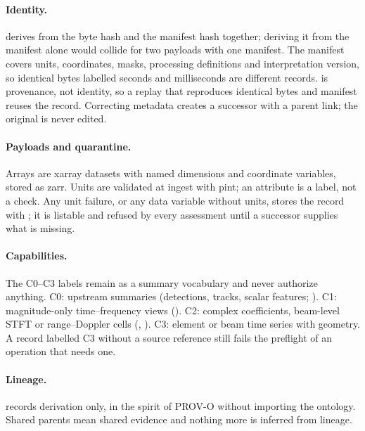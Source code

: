 \documentclass[11pt,a4paper]{article}
\begin{document}
\paragraph{Identity.}  derives from the byte hash and the manifest hash together; deriving it from the manifest alone would collide for two payloads with one manifest. The manifest covers units, coordinates, masks, processing definitions and interpretation version, so identical bytes labelled seconds and milliseconds are different records.  is provenance, not identity, so a replay that reproduces identical bytes and manifest reuses the record. Correcting metadata creates a successor with a parent link; the original is never edited.

\paragraph{Payloads and quarantine.} Arrays are xarray datasets with named dimensions and coordinate variables, stored as zarr. Units are validated at ingest with pint; an attribute is a label, not a check. Any unit failure, or any data variable without units, stores the record with ; it is listable and refused by every assessment until a successor supplies what is missing.

\paragraph{Capabilities.} The C0--C3 labels remain as a summary vocabulary and never authorize anything. C0: upstream summaries (detections, tracks, scalar features; ). C1: magnitude-only time--frequency views (). C2: complex coefficients, beam-level STFT or range--Doppler cells (, ). C3: element or beam time series with geometry. A record labelled C3 without a source reference still fails the preflight of an operation that needs one.

\paragraph{Lineage.}  records derivation only, in the spirit of PROV-O without importing the ontology. Shared parents mean shared evidence and nothing more is inferred from lineage.
\end{document}
